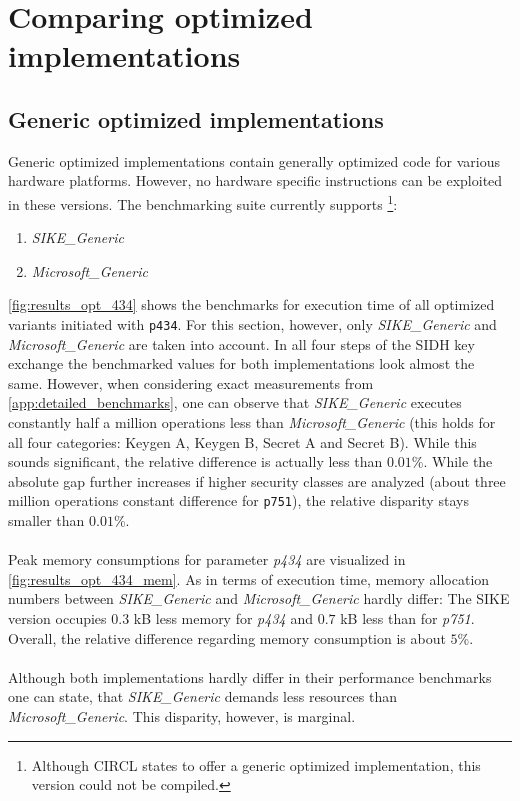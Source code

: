 \section{Comparing optimized implementations}

\subsection{Generic optimized implementations}
Generic optimized implementations contain generally optimized code for various hardware platforms. However, no hardware specific instructions can be exploited in these versions. The benchmarking suite currently supports \footnote{Although CIRCL states to offer a generic optimized implementation\parencite{circl2020github}, this version could not be compiled.}:
\begin{enumerate}
\item \textit{SIKE\_Generic}
\item \textit{Microsoft\_Generic}
\end{enumerate}
\autoref{fig:results_opt_434} shows the benchmarks for execution time of all optimized variants initiated with \texttt{p434}. For this section, however, only \textit{SIKE\_Generic} and \textit{Microsoft\_Generic} are taken into account. In all four steps of the SIDH key exchange the benchmarked values for both implementations look almost the same. However, when considering exact measurements from  \ref{app:detailed_benchmarks}, one can observe that \textit{SIKE\_Generic} executes constantly half a million operations less than \textit{Microsoft\_Generic} (this holds for all four categories: Keygen A, Keygen B, Secret A and Secret B). While this sounds significant, the relative difference is actually less than $0.01$\%. While the absolute gap further increases if higher security classes are analyzed (about three million operations constant difference for \texttt{p751}), the relative disparity stays smaller than $0.01$\%.
\\\\
Peak memory consumptions for parameter \textit{p434} are visualized in  \autoref{fig:results_opt_434_mem}. As in terms of execution time, memory allocation numbers between \textit{SIKE\_Generic} and \textit{Microsoft\_Generic} hardly differ: The SIKE version occupies $0.3$ kB less memory for \textit{p434} and $0.7$ kB less than for \textit{p751}. Overall, the relative difference regarding memory consumption is about $5$\%.
\\\\
Although both implementations hardly differ in their performance benchmarks one can state, that \textit{SIKE\_Generic} demands less resources than \textit{Microsoft\_Generic}. This disparity, however, is marginal.

